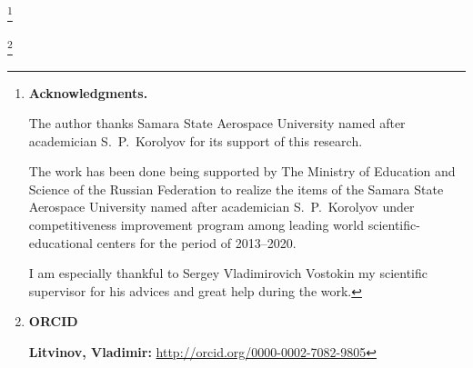 \RuDate



\vspace{1cm}



\makeentitle





\thanks{{\bf Acknowledgments.}

The author thanks Samara State Aerospace University named after academician S.~P.~Korolyov for its support of this research. 

The work has been done being supported by The Ministry of Education and Science of the Russian Federation to realize the items of the Samara State Aerospace University named after academician S.~P.~Korolyov under competitiveness improvement program among leading world scientific-educational centers for the period of 2013--2020.



I am especially thankful to Sergey Vladimirovich Vostokin my scientific supervisor for his advices and great help during the work.}



\thanks{{\bf ORCID}



{\bf Litvinov, Vladimir:} \url{http://orcid.org/0000-0002-7082-9805}

}





\EngRef







